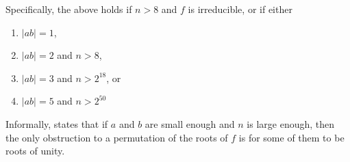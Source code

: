\documentclass[../main.tex]{subfiles}
\begin{document}
\begin{theorem}
  Specifically, the above holds if $n > 8$ and $f$ is irreducible, or if either 
  \begin{enumerate}
    \item $\left| ab \right| = 1$,
    \item $\left| ab \right| = 2$ and $n > 8$,
    \item $\left| ab \right| = 3$ and $n > 2^{18}$, or 
    \item $\left| ab \right| = 5$ and $n > 2^{50}$ 
  \end{enumerate}
\end{theorem}

Informally,  states that 
if $a$ and $b$ are small enough and $n$ is large enough, then the only obstruction to a permutation of the roots of $f$ is
for some of them to be roots of unity.
\end{document}
